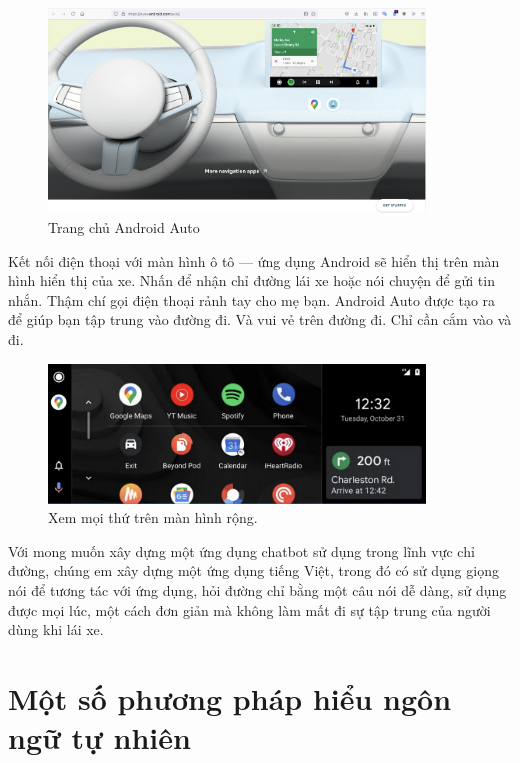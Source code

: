 \begin{figure}[H]
    \centering
    \includegraphics[width=10cm]{images/Android-Auto.png}
    \caption{Trang chủ Android Auto}
    \label{fig:homepage-android-auto}
\end{figure}

Kết nối điện thoại với màn hình ô tô — ứng dụng Android sẽ hiển thị trên màn hình hiển thị của xe. Nhấn để nhận chỉ đường lái xe hoặc nói chuyện để gửi tin nhắn. Thậm chí gọi điện thoại rảnh tay cho mẹ bạn. Android Auto được tạo ra để giúp bạn tập trung vào đường đi. Và vui vẻ trên đường đi. Chỉ cần cắm vào và đi.

\begin{figure}[H]
    \centering
    \includegraphics[width=10cm]{images/widescreen.png}
    \caption{Xem mọi thứ trên màn hình rộng.}
    \label{fig:homepage-widescreen-Android}
\end{figure}

Với mong muốn xây dựng một ứng dụng chatbot sử dụng trong lĩnh vực chỉ đường, chúng em xây dựng một ứng dụng tiếng Việt, trong đó có sử dụng giọng nói để tương tác với ứng dụng, hỏi đường chỉ bằng một câu nói dễ dàng, sử dụng được mọi lúc, một cách đơn giản mà không làm mất đi sự tập trung của người dùng khi lái xe.

\section{Một số phương pháp hiểu ngôn ngữ tự nhiên}

